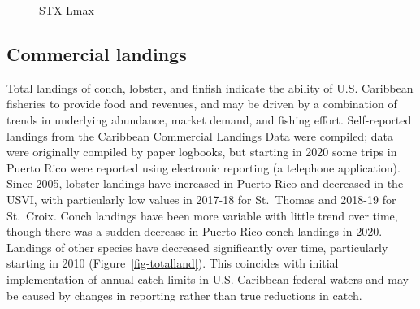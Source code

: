\documentclass[
  letterpaper,
  oneside,
  open=any]{scrbook}
\begin{document}
\begin{figure}


\caption{\label{fig-STXLmax}STX Lmax}

\end{figure}%

\subsection{Commercial landings}\label{commercial-landings}

Total landings of conch, lobster, and finfish indicate the ability of
U.S. Caribbean fisheries to provide food and revenues, and may be driven
by a combination of trends in underlying abundance, market demand, and
fishing effort. Self-reported landings from the Caribbean Commercial
Landings Data were compiled; data were originally compiled by paper
logbooks, but starting in 2020 some trips in Puerto Rico were reported
using electronic reporting (a telephone application). Since 2005,
lobster landings have increased in Puerto Rico and decreased in the
USVI, with particularly low values in 2017-18 for St.~Thomas and 2018-19
for St.~Croix. Conch landings have been more variable with little trend
over time, though there was a sudden decrease in Puerto Rico conch
landings in 2020. Landings of other species have decreased significantly
over time, particularly starting in 2010 (Figure~\ref{fig-totalland}).
This coincides with initial implementation of annual catch limits in
U.S. Caribbean federal waters and may be caused by changes in reporting
rather than true reductions in catch.
\end{document}
